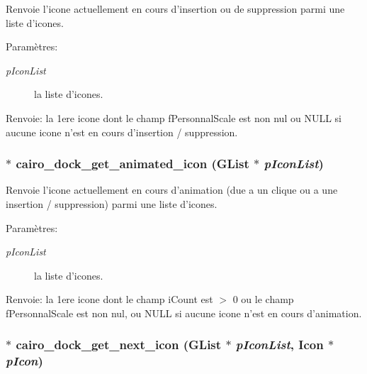Renvoie l'icone actuellement en cours d'insertion ou de suppression parmi une liste d'icones. \begin{Desc}
\item[Paramètres:]
\begin{description}
\item[{\em pIconList}]la liste d'icones. \end{description}
\end{Desc}
\begin{Desc}
\item[Renvoie:]la 1ere icone dont le champ fPersonnalScale est non nul ou NULL si aucune icone n'est en cours d'insertion / suppression. \end{Desc}
\subsubsection{$\ast$ cairo\_\-dock\_\-get\_\-animated\_\-icon (GList $\ast$ {\em pIconList})}\label{cairo-dock-icons_8h_a06250cef09ef759aa1ad5d6cd857ab1}


Renvoie l'icone actuellement en cours d'animation (due a un clique ou a une insertion / suppression) parmi une liste d'icones. \begin{Desc}
\item[Paramètres:]
\begin{description}
\item[{\em pIconList}]la liste d'icones. \end{description}
\end{Desc}
\begin{Desc}
\item[Renvoie:]la 1ere icone dont le champ iCount est $>$ 0 ou le champ fPersonnalScale est non nul, ou NULL si aucune icone n'est en cours d'animation. \end{Desc}
\subsubsection{$\ast$ cairo\_\-dock\_\-get\_\-next\_\-icon (GList $\ast$ {\em pIconList}, {\bf Icon} $\ast$ {\em pIcon})}\label{cairo-dock-icons_8h_9175d5e7c32d59cf31f7f70d6530f815}


